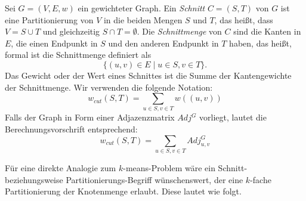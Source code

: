 \begin{definition}
	Sei $G=(V,E,w)$ ein gewichteter Graph. Ein \emph{Schnitt} $C=(S,T)$ von $G$ ist eine Partitionierung von $V$ in die beiden
	Mengen $S$ und $T$, das heißt, dass $V = S \cup T$ und gleichzeitig $S \cap T = \emptyset$.
	Die \emph{Schnittmenge} von $C$ sind die Kanten in $E$, die einen
	Endpunkt in $S$ und den anderen Endpunkt in $T$ haben, das heißt, formal ist die Schnittmenge definiert als
	\[ \{ (u,v) \in E \mid u \in S, v \in T \}. \]
	Das Gewicht oder der Wert eines Schnittes ist die Summe der Kantengewichte der Schnittmenge. Wir verwenden die folgende
	Notation:
	\[ w_{cut}(S,T) = \sum_{u \in S, v \in T} w((u,v)) \]
	Falls der Graph in Form einer Adjazenzmatrix $Adj^G$ vorliegt, lautet die Berechnungsvorschrift entsprechend:
	\[ w_{cut}(S,T) = \sum_{u \in S, v \in T} Adj^G_{u,v} \]
\end{definition}
Für eine direkte Analogie zum $k$-means-Problem wäre ein Schnitt- beziehungsweise Partitionierungs-Begriff wünschenswert,
der eine $k$-fache Partitionierung der Knotenmenge erlaubt. Diese lautet wie folgt.

